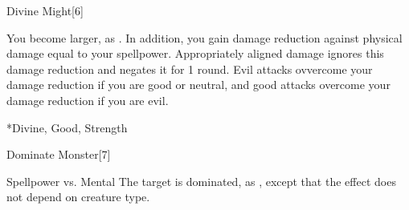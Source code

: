 \begin{spellsection}{Divine Might}[6]
    \begin{spellheader}
    \end{spellheader}
    \begin{spellcontent}
        \begin{spelltargetinginfo}
        \end{spelltargetinginfo}
        \begin{spelleffects}
            \spellsuccess You become larger, as . In addition, you gain damage reduction against physical damage equal to your spellpower. Appropriately aligned damage ignores this damage reduction and negates it for 1 round. Evil attacks ovvercome your damage reduction if you are good or neutral, and good attacks overcome your damage reduction if you are evil.
            \spelldur \durshort \dismissable
        \end{spelleffects}
    \end{spellcontent}
    \begin{spellfooter}
        *{Divine, Good, Strength}
        \spellnotes \sizingspellnotes
        \miscastexplode
    \end{spellfooter}
\end{spellsection}


\begin{spellsection}{Dominate Monster}[7]
    \begin{spellheader}
    \end{spellheader}
    \begin{spellcontent}
        \begin{spelltargetinginfo}
        \end{spelltargetinginfo}
        \begin{spelleffects}
            \begin{spellattack}{Spellpower vs. Mental}
                \spellsuccess The target is dominated, as , except that the effect does not depend on creature type.
            \end{spellattack}
        \end{spelleffects}
    \end{spellcontent}
    \begin{spellfooter}
        \miscastrandom
    \end{spellfooter}
\end{spellsection}

